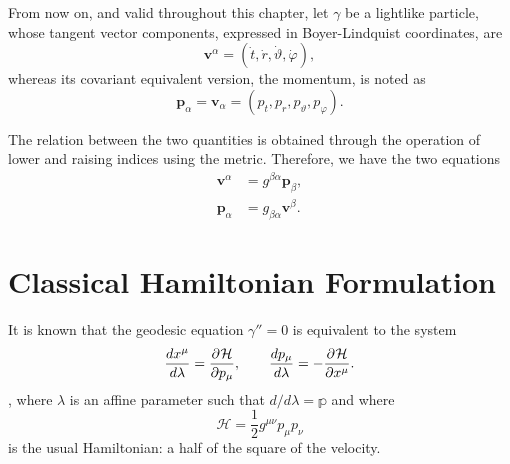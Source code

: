 From now on, and valid throughout this chapter, let $\gamma$ be a lightlike particle, whose tangent vector components, expressed in Boyer-Lindquist coordinates, are
\begin{equation}
	\label{eq:blcoord1}
	\mathbf{v}^\alpha = (\dot{t}, \dot{r}, \dot{\vartheta}, \dot{\varphi}),
\end{equation}
whereas its covariant equivalent version, the momentum, is noted as
\begin{equation}
	\label{eq:blcoord2}
	\mathbf{p}_\alpha = \mathbf{v}_\alpha = (p_t, p_r, p_\vartheta, p_\varphi).
\end{equation}

The relation between the two quantities is obtained through the operation of lower and raising indices using the metric. Therefore, we have the two equations
\begin{align}
	\label{eq:raisep}
	\mathbf{v}^\alpha &= g^{\beta\alpha} \mathbf{p}_\beta, \\
	\label{eq:lowerv}
	\mathbf{p}_\alpha &= g_{\beta\alpha} \mathbf{v}^\beta.
\end{align}

\section{Classical Hamiltonian Formulation}

It is known \cite[Sec. 33.5]{thorne73} that the geodesic equation $\gamma'' = 0$ is equivalent to the system
\begin{equation*}
	\frac{dx^\mu}{d\lambda} = \frac{\partial^{} \mathcal{H}}{\partial p_\mu}, \qquad
	\frac{dp_\mu}{d\lambda} = - \frac{\partial^{} \mathcal{H}}{\partial x^\mu}.
\end{equation*},
where $\lambda$ is an affine parameter such that $d/d\lambda = \mathbb{p}$ and where
\[
	\mathcal{H} = \frac{1}{2} g^{\mu\nu} p_\mu p_\nu
\]
is the usual Hamiltonian: a half of the square of the velocity.

